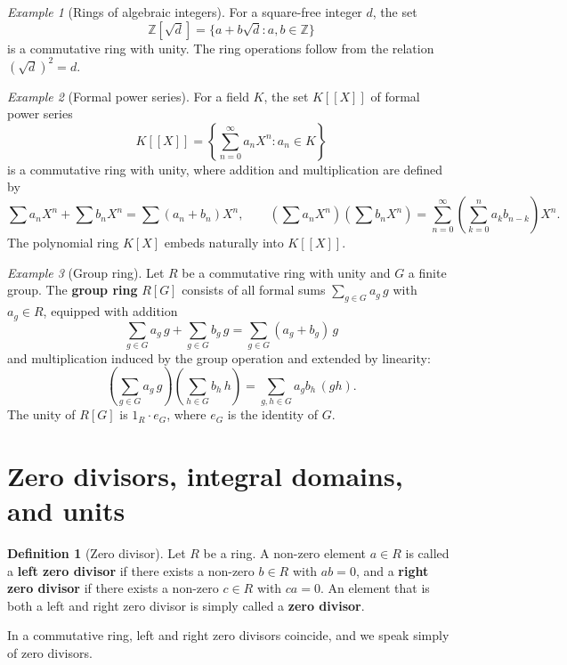\documentclass[12pt,a4paper,openany]{book}
\theoremstyle{definition}
\newtheorem{definition}{Definition}[chapter]
\theoremstyle{remark}
\newtheorem{example}{Example}[chapter]
\begin{document}
\begin{example}[Rings of algebraic integers]\label{ex:algebraic-integers}
For a square-free integer $d$, the set
\[
    \mathbb{Z}[\sqrt{d}] = \{a+b\sqrt{d} : a,b\in\mathbb{Z}\}
\]
is a commutative ring with unity. The ring operations follow from the relation $(\sqrt{d})^2=d$.
\end{example}

\begin{example}[Formal power series]\label{ex:formal-power-series}
For a field $K$, the set $K[[X]]$ of formal power series
\[
    K[[X]] = \left\{\sum_{n=0}^{\infty}a_nX^n : a_n\in K\right\}
\]
is a commutative ring with unity, where addition and multiplication are defined by
\[
    \sum a_nX^n + \sum b_nX^n = \sum(a_n+b_n)X^n,\qquad
    \left(\sum a_nX^n\right)\left(\sum b_nX^n\right) = \sum_{n=0}^{\infty}\left(\sum_{k=0}^{n}a_kb_{n-k}\right)X^n.
\]
The polynomial ring $K[X]$ embeds naturally into $K[[X]]$.
\end{example}

\begin{example}[Group ring]\label{ex:group-ring}
Let $R$ be a commutative ring with unity and $G$ a finite group. The \textbf{group ring} $R[G]$ consists of all formal sums $\sum_{g\in G}a_g\,g$ with $a_g\in R$, equipped with addition
\[
    \sum_{g\in G}a_g\,g + \sum_{g\in G}b_g\,g = \sum_{g\in G}(a_g+b_g)\,g
\]
and multiplication induced by the group operation and extended by linearity:
\[
    \left(\sum_{g\in G}a_g\,g\right)\left(\sum_{h\in G}b_h\,h\right) = \sum_{g,h\in G}a_gb_h\,(gh).
\]
The unity of $R[G]$ is $1_R\cdot e_G$, where $e_G$ is the identity of $G$.
\end{example}

\section{Zero divisors, integral domains, and units}\label{sec:zero-div-units}

\begin{definition}[Zero divisor]\label{def:zero-divisor}
Let $R$ be a ring. A non-zero element $a\in R$ is called a \textbf{left zero divisor} if there exists a non-zero $b\in R$ with $ab=0$, and a \textbf{right zero divisor} if there exists a non-zero $c\in R$ with $ca=0$. An element that is both a left and right zero divisor is simply called a \textbf{zero divisor}.

In a commutative ring, left and right zero divisors coincide, and we speak simply of zero divisors.
\end{definition}
\end{document}
